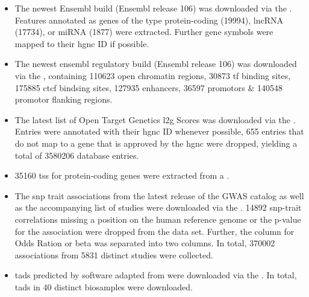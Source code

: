 \begin{itemize}
    \item {} The newest Ensembl build (Ensembl release 106) was downloaded via the . Features annotated as genes of the type protein-coding (19994), \ac{lncRNA} (17734), or \ac{miRNA} (1877) were extracted. Further gene symbols were mapped to their \ac{hgnc} ID if possible.

    \item {} The newest ensembl regulatory build (Ensembl release 106) was downloaded via the , containing 110623 open chromatin regions, 30873 \ac{tf} binding sites, 175885 \ac{ctcf} bindsing sites, 127935 enhancers, 36597 promotors \& 140548 promotor flanking regions.

    \item {} The latest list of Open Target Genetics \ac{l2g} Scores was downloaded via the . Entries were annotated with their \ac{hgnc} ID whenever possible, 655 entries that do not map to a gene that is approved by the \ac{hgnc} were dropped, yielding a total of 3580206 database entries.

    \item {} 35160 \ac{tss} for protein-coding genes were extracted from a .

    \item {} The \ac{snp} trait associations from the latest release of the GWAS catalog as well as the accompanying list of studies were downloaded via the . 14892 \ac{snp}-trait correlations missing a position on the human reference genome or the p-value for the association were dropped from the data set. Further, the column for Odds Ration or beta was separated into two columns. In total, 370002 associations from 5831 distinct studies were collected.

    \item {} \acp{tad} predicted by software adapted from \textcite{dixonTopologicalDomainsMammalian2012} were downloaded via the . In total, \acp{tad} in 40 distinct biosamples were downloaded.


\end{itemize}
